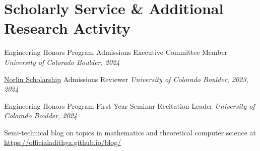 \documentclass[a4paper,20pt]{article}
\begin{document}
    \section{Scholarly Service \& Additional Research Activity}
    \begin{description}[font=$\bullet$]
    \item Engineering Honors Program Admissions Executive Committee Member \hfill \textit{University of Colorado Boulder, 2024}
    \vspace{-5pt}
    \item \href{https://www.colorado.edu/boettcher-daniels-norlin-scholars/norlin-scholars}{Norlin Scholarship} Admissions Reviewer \hfill \textit{University of Colorado Boulder, 2023, 2024}
    \vspace{-5pt}
    \item Engineering Honors Program First-Year Seminar Recitation Leader \hfill \textit{University of Colorado Boulder, 2024}
    \vspace{-5pt}
    \item Semi-technical blog on topics in mathematics and theoretical computer science at \href{https://officialadithya.github.io/blog/}{https://officialadithya.github.io/blog/}
    \vspace{-5pt}
    \end{description}
    
\end{document}
